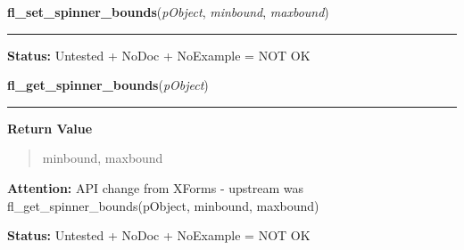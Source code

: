     \label{xformslib:library:fl_set_spinner_bounds}

    \vspace{0.5ex}

\hspace{.8\funcindent}\begin{boxedminipage}{\funcwidth}

    \raggedright \textbf{fl\_set\_spinner\_bounds}(\textit{pObject}, \textit{minbound}, \textit{maxbound})

    \vspace{-1.5ex}

    \rule{\textwidth}{0.5\fboxrule}
\setlength{\parskip}{2ex}
\setlength{\parskip}{1ex}
\textbf{Status:} Untested + NoDoc + NoExample = NOT OK



    \end{boxedminipage}

    \label{xformslib:library:fl_get_spinner_bounds}

    \vspace{0.5ex}

\hspace{.8\funcindent}\begin{boxedminipage}{\funcwidth}

    \raggedright \textbf{fl\_get\_spinner\_bounds}(\textit{pObject})

    \vspace{-1.5ex}

    \rule{\textwidth}{0.5\fboxrule}
\setlength{\parskip}{2ex}
\setlength{\parskip}{1ex}
      \textbf{Return Value}
    \vspace{-1ex}

      \begin{quote}
      minbound, maxbound

      \end{quote}

\textbf{Attention:} API change from XForms - upstream was fl\_get\_spinner\_bounds(pObject, 
minbound, maxbound)



\textbf{Status:} Untested + NoDoc + NoExample = NOT OK



    \end{boxedminipage}

